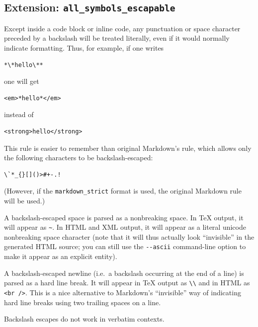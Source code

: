 \documentclass[
  b5paper
]{book}
\begin{document}
\subsection{\texorpdfstring{Extension:
\texttt{all\_symbols\_escapable}}{Extension: all\_symbols\_escapable}}\label{extension-all_symbols_escapable}

Except inside a code block or inline code, any punctuation or space
character preceded by a backslash will be treated literally, even if it
would normally indicate formatting. Thus, for example, if one writes

\begin{verbatim}
*\*hello\**
\end{verbatim}

one will get

\begin{verbatim}
<em>*hello*</em>
\end{verbatim}

instead of

\begin{verbatim}
<strong>hello</strong>
\end{verbatim}

This rule is easier to remember than original Markdown's rule, which
allows only the following characters to be backslash-escaped:

\begin{verbatim}
\`*_{}[]()>#+-.!
\end{verbatim}

(However, if the \texttt{markdown\_strict} format is used, the original
Markdown rule will be used.)

A backslash-escaped space is parsed as a nonbreaking space. In TeX
output, it will appear as \texttt{\textasciitilde{}}. In HTML and XML
output, it will appear as a literal unicode nonbreaking space character
(note that it will thus actually look ``invisible'' in the generated
HTML source; you can still use the \texttt{-\/-ascii} command-line
option to make it appear as an explicit entity).

A backslash-escaped newline (i.e.~a backslash occurring at the end of a
line) is parsed as a hard line break. It will appear in TeX output as
\texttt{\textbackslash{}\textbackslash{}} and in HTML as
\texttt{\textless{}br\ /\textgreater{}}. This is a nice alternative to
Markdown's ``invisible'' way of indicating hard line breaks using two
trailing spaces on a line.

Backslash escapes do not work in verbatim contexts.
\end{document}
